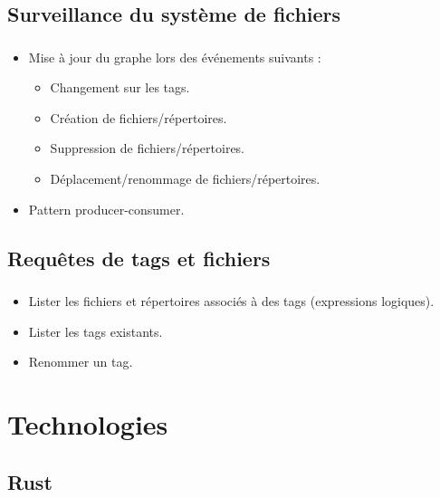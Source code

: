 \documentclass[10pt]{beamer}
\begin{document}
\subsection{Surveillance du système de fichiers}
\begin{frame}
    \frametitle{\subsecname}
    \begin{itemize}
        \item Mise à jour du graphe lors des événements suivants :
        \begin{itemize}
            \item Changement sur les tags.
            \item Création de fichiers/répertoires.
            \item Suppression de fichiers/répertoires.
            \item Déplacement/renommage de fichiers/répertoires.
        \end{itemize}
        \item Pattern producer-consumer.
    \end{itemize}
\end{frame}

\subsection{Requêtes de tags et fichiers}
\begin{frame}
    \frametitle{\subsecname}
    \begin{itemize}
        \item Lister les fichiers et répertoires associés à des tags (expressions logiques).
        \item Lister les tags existants.
        \item Renommer un tag.
    \end{itemize}
\end{frame}

\section{Technologies}
\subsection{Rust}
\end{document}

